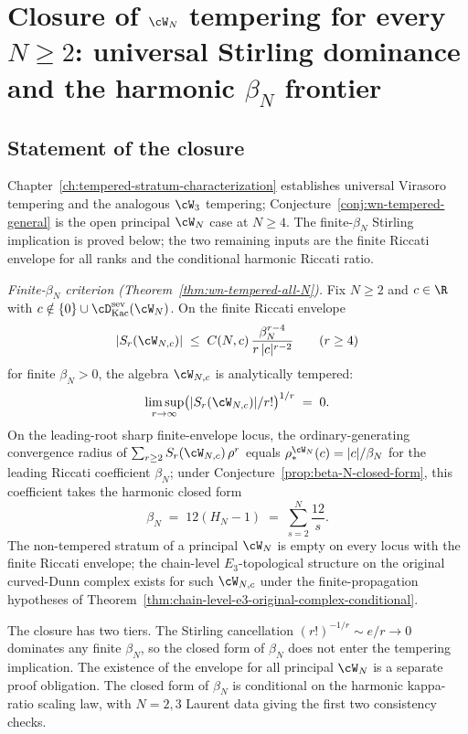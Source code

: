 \chapter{Closure of $\cW_N$ tempering for every $N \ge 2$:
universal Stirling dominance and the harmonic $\beta_N$ frontier}
\label{ch:wn-tempered-closure}

\section*{Statement of the closure}

Chapter~\ref{ch:tempered-stratum-characterization} establishes
universal Virasoro tempering and the analogous $\cW_3$ tempering;
Conjecture~\ref{conj:wn-tempered-general} is the open principal
$\cW_N$ case at $N \ge 4$. The finite-$\beta_N$ Stirling
implication is proved below; the two remaining inputs are the finite
Riccati envelope for all ranks and the conditional harmonic Riccati
ratio.

\emph{Finite-$\beta_N$ criterion (Theorem~\ref{thm:wn-tempered-all-N}).}
Fix $N \ge 2$ and $c \in \R$ with
$c \notin \{0\} \cup \cD^{\mathrm{sev}}_{\mathrm{Kac}}(\cW_N)$. On the
finite Riccati envelope
\[
 \lvert S_r(\cW_{N,c}) \rvert
 \;\le\;
 C(N,c)\,\frac{\beta_N^{r-4}}{r\,|c|^{r-2}}
 \qquad (r\ge 4)
\]
for finite $\beta_N>0$, the algebra $\cW_{N,c}$ is analytically
tempered:
\[
 \limsup_{r \to \infty}
 \bigl(\lvert S_r(\cW_{N,c}) \rvert / r!\bigr)^{1/r}
 \;=\;
 0.
\]
On the leading-root sharp finite-envelope locus, the ordinary-generating
convergence radius of $\sum_{r \ge 2} S_r(\cW_{N,c})\,\rho^r$ equals
$\rho_*^{\cW_N}(c) = \lvert c\rvert / \beta_N$ for the leading
Riccati coefficient $\beta_N$; under
Conjecture~\ref{prop:beta-N-closed-form}, this coefficient takes the
harmonic closed form
\[
 \beta_N \;=\; 12(H_N - 1)
 \;=\; \sum_{s=2}^{N} \frac{12}{s}.
\]
The non-tempered stratum of a principal $\cW_N$ is empty on every
locus with the finite Riccati envelope; the chain-level
$E_3$-topological structure on the original curved-Dunn complex
exists for such $\cW_{N,c}$ under the finite-propagation hypotheses
of Theorem~\ref{thm:chain-level-e3-original-complex-conditional}.

The closure has two tiers. The Stirling cancellation
$(r!)^{-1/r} \sim e/r \to 0$ dominates any finite $\beta_N$, so the
closed form of $\beta_N$ does not enter the tempering implication.
The existence of the envelope for all principal $\cW_N$ is a separate
proof obligation. The closed form of $\beta_N$ is conditional on the
harmonic kappa-ratio scaling law, with $N = 2, 3$ Laurent data giving
the first two consistency checks.

